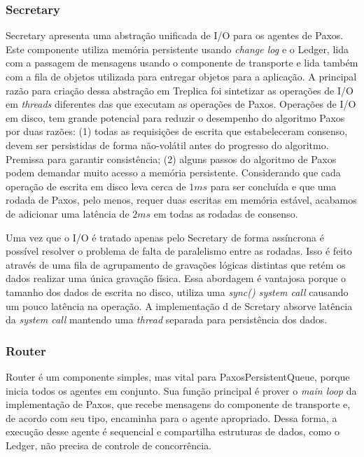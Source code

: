 \subsubsection{Secretary}

Secretary apresenta uma abstração unificada de I/O para os agentes de Paxos. Este
componente utiliza memória persistente usando \emph{change log} e o Ledger, lida com a
passagem de mensagens usando o componente de transporte e lida também com a fila de
objetos utilizada para entregar objetos para a aplicação. A principal razão para criação
dessa abstração em Treplica foi sintetizar as operações de I/O em \emph{threads}
diferentes das que executam as operações de Paxos. Operações de I/O em disco, tem grande
potencial para reduzir o desempenho do algoritmo Paxos por duas razões: (1) todas as
requisições de escrita que estabeleceram consenso, devem ser persistidas de forma
não-volátil antes do progresso do algoritmo. Premissa para garantir consistência; (2)
alguns passos do algoritmo de Paxos podem demandar muito acesso a memória persistente.
Considerando que cada operação de escrita em disco leva cerca de $1ms$ para ser concluída
e que uma rodada de Paxos, pelo menos, requer duas escritas em memória estável, acabamos
de adicionar uma latência de $2ms$ em todas as rodadas de consenso.

Uma vez que o I/O é tratado apenas pelo Secretary de forma assíncrona é possível resolver
o problema de falta de paralelismo entre as rodadas. Isso é feito através de uma fila de
agrupamento de gravações lógicas distintas que retém os dados realizar uma única gravação
física. Essa abordagem é vantajosa porque o tamanho dos dados de escrita no disco, utiliza
uma \emph{sync() system call} causando um pouco latência na operação. A implementação d
de Scretary absorve latência da \emph{system call} mantendo uma \emph{thread} separada
para persistência dos dados.

\subsubsection{Router}

Router é um componente simples, mas vital para PaxosPersistentQueue, porque inicia todos
os agentes em conjunto. Sua função principal é prover o \emph{main loop} da implementação
de Paxos, que recebe mensagens do componente de transporte e, de acordo com seu tipo,
encaminha para o agente apropriado. Dessa forma, a execução desse agente é sequencial e
compartilha estruturas de dados, como o Ledger, não precisa de controle de concorrência.

